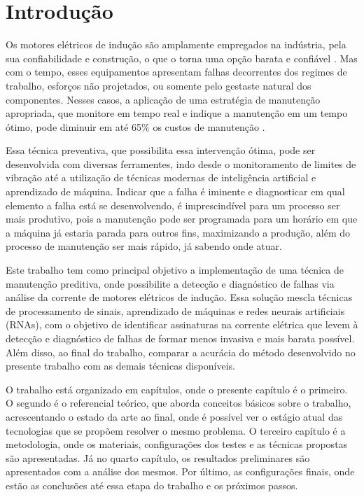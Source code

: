 
\chapter[Introdução]{Introdução}

Os motores elétricos de indução são amplamente empregados na indústria, pela sua confiabilidade e construção, o que o torna uma opção 
barata e confiável \cite{Umans2003}. Mas com o tempo, esses equipamentos apresentam falhas decorrentes dos regimes de trabalho, esforços não 
projetados, ou somente pelo gestaste natural dos componentes. Nesses casos, a aplicação de uma estratégia de manutenção apropriada, que
monitore em tempo real e indique a manutenção em um tempo ótimo, pode diminuir em até 65\% os custos de manutenção \cite{Wu2013}. 

Essa técnica preventiva, que possibilita essa intervenção ótima, pode ser desenvolvida com diversas ferramentes, indo desde o monitoramento
de limites de vibração até a utilização de técnicas modernas de inteligência artificial e aprendizado de máquina. Indicar que a falha é
iminente e diagnosticar em qual elemento a falha está se desenvolvendo, é imprescindível para um processo ser mais produtivo, pois 
a manutenção pode ser programada para um horário em que a máquina já estaria parada para outros fins, maximizando a produção, além do
processo de manutenção ser mais rápido, já sabendo onde atuar.

Este trabalho tem como principal objetivo a implementação de uma técnica de manutenção preditiva, onde possibilite a detecção e diagnóstico
de falhas via análise da corrente de motores elétricos de indução. Essa solução mescla técnicas de processamento de sinais, 
aprendizado de máquinas e redes neurais artificiais (RNAs), com o objetivo de identificar assinaturas na corrente elétrica que levem à
detecção e diagnóstico de falhas de formar menos invasiva e mais barata possível. Além disso, ao final do trabalho, comparar a acurácia 
do método desenvolvido no presente trabalho com as demais técnicas disponíveis.

O trabalho está organizado em capítulos, onde o presente capítulo é o primeiro. O segundo é o referencial teórico, que aborda conceitos
básicos sobre o trabalho, acrescentando o estado da arte ao final, onde é possível ver o estágio atual das tecnologias que se propõem 
resolver o mesmo problema. O terceiro capítulo é a metodologia, onde os materiais, configurações dos testes e as técnicas propostas são 
apresentadas. Já no quarto capítulo, os resultados preliminares são apresentados com a análise dos mesmos. Por último, as configurações 
finais, onde estão as conclusões até essa etapa do trabalho e os próximos passos.




